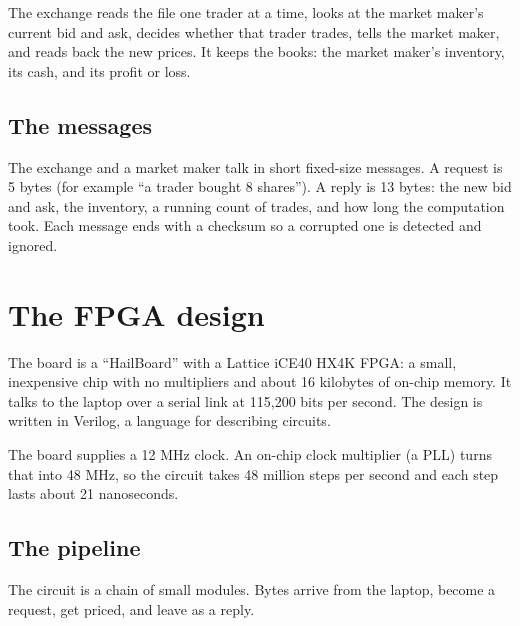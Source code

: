 \documentclass[11pt]{article}
\begin{document}
The exchange reads the file one trader at a time, looks at the market maker's
current bid and ask, decides whether that trader trades, tells the market
maker, and reads back the new prices. It keeps the books: the market maker's
inventory, its cash, and its profit or loss.

\subsection{The messages}

The exchange and a market maker talk in short fixed-size messages. A request
is 5 bytes (for example ``a trader bought 8 shares''). A reply is 13 bytes:
the new bid and ask, the inventory, a running count of trades, and how long
the computation took. Each message ends with a checksum so a corrupted one is
detected and ignored.

\section{The FPGA design}

The board is a ``HailBoard'' with a Lattice iCE40 HX4K FPGA: a small,
inexpensive chip with no multipliers and about 16 kilobytes of on-chip memory.
It talks to the laptop over a serial link at 115{,}200 bits per second. The
design is written in Verilog, a language for describing circuits.

The board supplies a 12 MHz clock. An on-chip clock multiplier (a PLL) turns
that into 48 MHz, so the circuit takes 48 million steps per second and each
step lasts about 21 nanoseconds.

\subsection{The pipeline}

The circuit is a chain of small modules. Bytes arrive from the laptop, become
a request, get priced, and leave as a reply.
\end{document}

